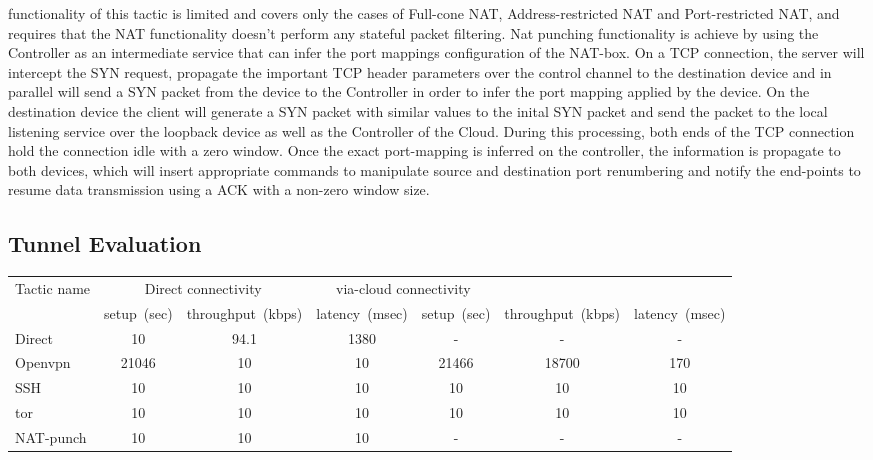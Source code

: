 \begin{itemize}
    functionality of this tactic is limited and covers only the cases of
    Full-cone NAT, Address-restricted NAT and Port-restricted NAT, and
    requires that the NAT functionality doesn't perform any stateful packet
    filtering. Nat punching functionality is achieve by using the Controller as
    an intermediate service that can infer the port mappings configuration of
    the NAT-box. On a TCP connection, the server will intercept the SYN
    request, propagate the important TCP header parameters over the control
    channel to the destination device and in parallel will send a SYN packet
    from the device to the Controller in order to infer the port mapping
    applied by the device. On the destination device the \signpost client
    will generate a SYN packet with similar values to the inital SYN packet
    and send the packet to the local listening service over the loopback
    device as well as the Controller of the Cloud. During this processing,
    both ends of the TCP connection hold the connection idle with a zero
    window. Once the exact port-mapping is inferred on the controller, the
    information is propagate to both devices, which will insert
    appropriate \of commands to manipulate source and destination port
    renumbering and notify the end-points to resume data transmission using
    a ACK with a non-zero window size.
\end{itemize}

\subsection{Tunnel Evaluation} \label{sec:sp-tactic-eval}

\begin{table}
\centering 
\begin{tabular}{|l|c|c|c|c|c|c| }
  \hline
  \multirow{2}{*}{Tactic name} & \multicolumn{2}{|c|}{Direct connectivity} &
  \multicolumn{2}{|c|}{via-cloud connectivity} \\
\cline{2-5}
& setup~(sec) & throughput~(kbps) & latency~(msec) & setup~(sec) &
throughput~(kbps) & latency~(msec) \\
\hline
Direct       & 10 & 94.1 & 1380 & - & - & - \\
Openvpn       & 21046 & 10 & 10 & 21466 & 18700 & 170\\
SSH       & 10 & 10 & 10 & 10 & 10 & 10 \\
tor       & 10 & 10 & 10 & 10 & 10 & 10\\
NAT-punch & 10 & 10 & 10 & - & - & - \\

\hline
\end{tabular}
\end{table}

